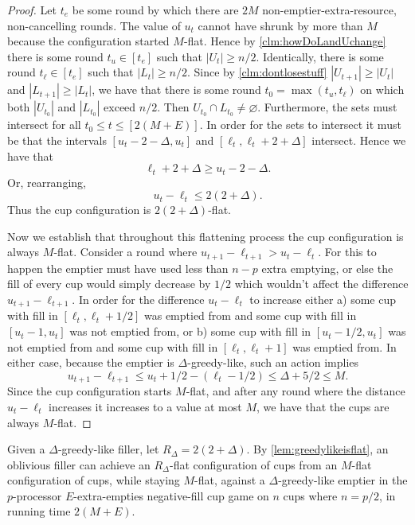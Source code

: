 \begin{proof}
  Let $t_e$ be some round by which there are $2M$
  non-emptier-extra-resource, non-cancelling rounds. The value of
  $u_t$ cannot have shrunk by more than $M$ because the
  configuration started $M$-flat. Hence by
  \cref{clm:howDoLandUchange} there is some round $t_u \in [t_e]$
  such that $|U_t|\ge n/2$. Identically, there is some round
  $t_\ell \in [t_e]$ such that $|L_t| \ge n/2$. Since by
  \cref{clm:dontlosestuff} $|U_{t+1}|\ge |U_t|$ and $|L_{t+1}|
  \ge |L_t|$, we have that there is some round $t_0 =\max(t_u,
  t_\ell)$ on which both $|U_{t_0}|$ and $|L_{t_0}|$ exceed
  $n/2$. Then $U_{t_0} \cap L_{t_0} \neq \varnothing$.
  Furthermore, the sets must intersect for all $t_0 \le t \le
  [2(M+E)]$. In order for the sets to intersect it must be that
  the intervals $[u_t-2-\Delta, u_t]$ and $[\ell_t,
  \ell_t+2+\Delta]$ intersect. Hence we have that
  $$\ell_t+2+\Delta \ge u_t-2-\Delta.$$ 
  Or, rearranging, 
  $$u_t - \ell_t \le 2(2+\Delta).$$ 
  Thus the cup configuration is $2(2+\Delta)$-flat.

  Now we establish that throughout this flattening process the cup
  configuration is always $M$-flat. Consider a round where
  $u_{t+1} - \ell_{t+1} > u_t - \ell_t$. For this to happen the
  emptier must have used less than $n-p$ extra emptying, or else
  the fill of every cup would simply decrease by $1/2$ which
  wouldn't affect the difference $u_{t+1} - \ell_{t+1}$.
  In order for the difference $u_t - \ell_t$ to 
  increase either a) some cup with fill in $[\ell_t, \ell_t + 1/2]$ was
  emptied from and some cup with fill in $[u_t-1, u_t]$ was not
  emptied from, or b) some cup with fill in $[u_t-1/2, u_t]$ was
  not emptied from and some cup with fill in $[\ell_t, \ell_t+1]$ was
  emptied from. In either case, because the emptier is
  $\Delta$-greedy-like, such an action implies
  $$u_{t+1} - \ell_{t+1} \le u_t +1/2 - (\ell_t -1/2)  \le \Delta + 5/2 \le M.$$
  Since the cup configuration starts $M$-flat, and after any
  round where the distance $u_t-\ell_t$ increases it increases to
  a value at most $M$, we have that the cups are always $M$-flat.
\end{proof}

Given a $\Delta$-greedy-like filler, let $R_\Delta =
2(2+\Delta).$ By \cref{lem:greedylikeisflat}, an oblivious filler
can achieve an $R_\Delta$-flat configuration of cups from an
$M$-flat configuration of cups, while staying $M$-flat, against a
$\Delta$-greedy-like emptier in the $p$-processor
$E$-extra-empties negative-fill cup game on $n$ cups where $n =
p/2$, in running time $2(M + E)$.

